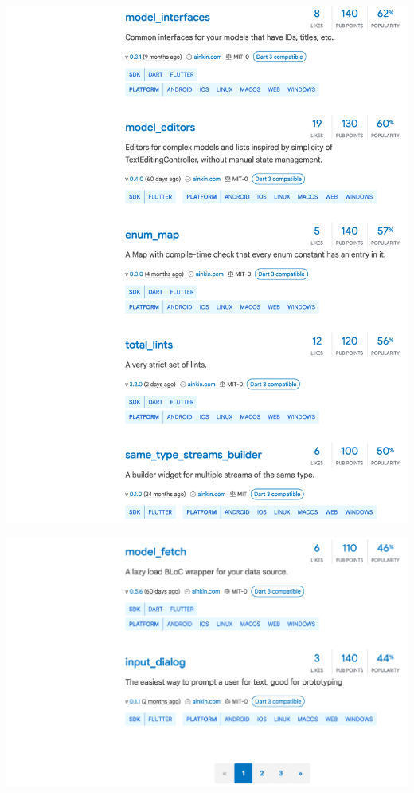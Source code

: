 \Continuing
\begin{center}
    \includegraphics[width=40em]{pub-ainkin-p2}
\end{center}
\WillContinue
\pagebreak

\Continuing
\begin{center}
    \includegraphics[width=40em]{pub-ainkin-p3}
\end{center}

\pagebreak
